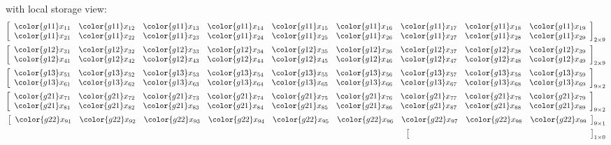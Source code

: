  with local storage view:
\begin{align*}
\left[
      \begin{array}{lllllllll}
      \color{g11}x_{11} & \color{g11}x_{12} & \color{g11}x_{13} & \color{g11}x_{14} & \color{g11}x_{15} & \color{g11}x_{16} & \color{g11}x_{17} & \color{g11}x_{18} & \color{g11}x_{19}\\
      \color{g11}x_{21} & \color{g11}x_{22} & \color{g11}x_{23} & \color{g11}x_{24} & \color{g11}x_{25} & \color{g11}x_{26} & \color{g11}x_{27} & \color{g11}x_{28} & \color{g11}x_{29}
      \end{array}
\right]_{2\times 9}
\\
\left[
      \begin{array}{lllllllll}
      \color{g12}x_{31} & \color{g12}x_{32} & \color{g12}x_{33} & \color{g12}x_{34} & \color{g12}x_{35} & \color{g12}x_{36} & \color{g12}x_{37} & \color{g12}x_{38} & \color{g12}x_{39}\\
      \color{g12}x_{41} & \color{g12}x_{42} & \color{g12}x_{43} & \color{g12}x_{44} & \color{g12}x_{45} & \color{g12}x_{46} & \color{g12}x_{47} & \color{g12}x_{48} & \color{g12}x_{49}
      \end{array}
\right]_{2\times 9}
\\
\left[
      \begin{array}{lllllllll}
      \color{g13}x_{51} & \color{g13}x_{52} & \color{g13}x_{53} & \color{g13}x_{54} & \color{g13}x_{55} & \color{g13}x_{56} & \color{g13}x_{57} & \color{g13}x_{58} & \color{g13}x_{59}\\
      \color{g13}x_{61} & \color{g13}x_{62} & \color{g13}x_{63} & \color{g13}x_{64} & \color{g13}x_{65} & \color{g13}x_{66} & \color{g13}x_{67} & \color{g13}x_{68} & \color{g13}x_{69}
      \end{array}
\right]_{9\times 2}
\\
\left[
      \begin{array}{lllllllll}
      \color{g21}x_{71} & \color{g21}x_{72} & \color{g21}x_{73} & \color{g21}x_{74} & \color{g21}x_{75} & \color{g21}x_{76} & \color{g21}x_{77} & \color{g21}x_{78} & \color{g21}x_{79}\\
      \color{g21}x_{81} & \color{g21}x_{82} & \color{g21}x_{83} & \color{g21}x_{84} & \color{g21}x_{85} & \color{g21}x_{86} & \color{g21}x_{87} & \color{g21}x_{88} & \color{g21}x_{89}
      \end{array}
\right]_{9\times 2}
\\
\left[
      \begin{array}{lllllllll}
      \color{g22}x_{91} & \color{g22}x_{92} & \color{g22}x_{93} & \color{g22}x_{94} & \color{g22}x_{95} & \color{g22}x_{96} & \color{g22}x_{97} & \color{g22}x_{98} & \color{g22}x_{99}\\
      \end{array}
\right]_{9\times 1}
\\
\left[
      \begin{array}{l}
      \hspace{7.65cm}
      \end{array}
\right]_{1\times 0}
\end{align*}


